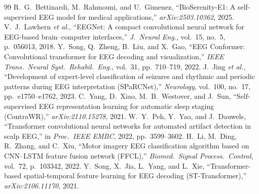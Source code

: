 \documentclass[journal]{IEEEtran}
\begin{document}
\begin{thebibliography}{99}
 R.~G.~Bettinardi, M.~Rahmouni, and U.~Gimenez, ``BioSerenity-E1: A self-supervised EEG model for medical applications,'' \emph{arXiv:2503.10362}, 2025.
 V.~J.~Lawhern \emph{et al.}, ``EEGNet: A compact convolutional neural network for EEG-based brain--computer interfaces,'' \emph{J.\ Neural Eng.}, vol.~15, no.~5, p.~056013, 2018.
 Y.~Song, Q.~Zheng, B.~Liu, and X.~Gao, ``EEG Conformer: Convolutional transformer for EEG decoding and visualization,'' \emph{IEEE Trans.\ Neural Syst.\ Rehabil.\ Eng.}, vol.~31, pp.~710--719, 2022.
 J.~Jing \emph{et al.}, ``Development of expert-level classification of seizures and rhythmic and periodic patterns during EEG interpretation (SPaRCNet),'' \emph{Neurology}, vol.~100, no.~17, pp.~e1750--e1762, 2023.
 C.~Yang, D.~Xiao, M.~B.~Westover, and J.~Sun, ``Self-supervised EEG representation learning for automatic sleep staging (ContraWR),'' \emph{arXiv:2110.15278}, 2021.
 W.~Y.~Peh, Y.~Yao, and J.~Dauwels, ``Transformer convolutional neural networks for automated artifact detection in scalp EEG,'' in \emph{Proc.\ IEEE EMBC}, 2022, pp.~3599--3602.
 H.~Li, M.~Ding, R.~Zhang, and C.~Xiu, ``Motor imagery EEG classification algorithm based on CNN--LSTM feature fusion network (FFCL),'' \emph{Biomed.\ Signal Process.\ Control}, vol.~72, p.~103342, 2022.
 Y.~Song, X.~Jia, L.~Yang, and L.~Xie, ``Transformer-based spatial-temporal feature learning for EEG decoding (ST-Transformer),'' \emph{arXiv:2106.11170}, 2021.
\end{thebibliography}
\end{document}
